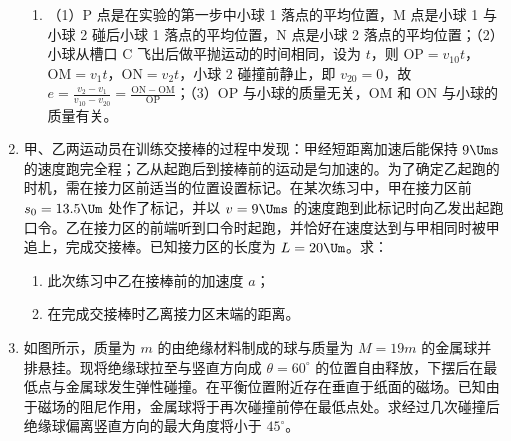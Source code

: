 \documentclass[\gkver]{gaokaozhenti}
\begin{document}
\begin{enumerate}
{\begin{enumerate}
	\item
	（1）P 点是在实验的第一步中小球 1 落点的平均位置，M 点是小球 1 与小球 2 碰后小球 1 落点的平均位置，N 点是小球 2 落点的平均位置；（2）小球从槽口 C 飞出后做平抛运动的时间相同，设为 $t$，则 $\mathrm{OP}=v_{10}t$，$\mathrm{OM}=v_{1}t$，$\mathrm{ON}=v_{2}t$，小球 2 碰撞前静止，即 $v_{20}=0$，故 $e=\frac{v_{2}-v_{1}}{v_{10}-v_{20}}=\frac{\mathrm{ON}-\mathrm{OM}}{\mathrm{OP}}$；（3）OP 与小球的质量无关，OM 和 ON 与小球的质量有关。

\end{enumerate}
}

\item
甲、乙两运动员在训练交接棒的过程中发现：甲经短距离加速后能保持 $9\Ums$ 的速度跑完全程；乙从起跑后到接棒前的运动是匀加速的。为了确定乙起跑的时机，需在接力区前适当的位置设置标记。在某次练习中，甲在接力区前 $s_{0}=13.5\Um$ 处作了标记，并以 $v=9\Ums$ 的速度跑到此标记时向乙发出起跑口令。乙在接力区的前端听到口令时起跑，并恰好在速度达到与甲相同时被甲追上，完成交接棒。已知接力区的长度为 $L=20\Um$。求：
\begin{enumerate}
	\item
	此次练习中乙在接棒前的加速度 $a$；
	\item
	在完成交接棒时乙离接力区末端的距离。
\end{enumerate}
\jdanswer{
\begin{enumerate}
	\item
	$3\Umsq$
	\item
	$6.5\Um$
\end{enumerate}
}

\item
如图所示，质量为 $m$ 的由绝缘材料制成的球与质量为 $M=19m$ 的金属球并排悬挂。现将绝缘球拉至与竖直方向成 $\theta=60^{\circ}$ 的位置自由释放，下摆后在最低点与金属球发生弹性碰撞。在平衡位置附近存在垂直于纸面的磁场。已知由于磁场的阻尼作用，金属球将于再次碰撞前停在最低点处。求经过几次碰撞后绝缘球偏离竖直方向的最大角度将小于 $45^{\circ}$。


\end{enumerate}
\end{document}

